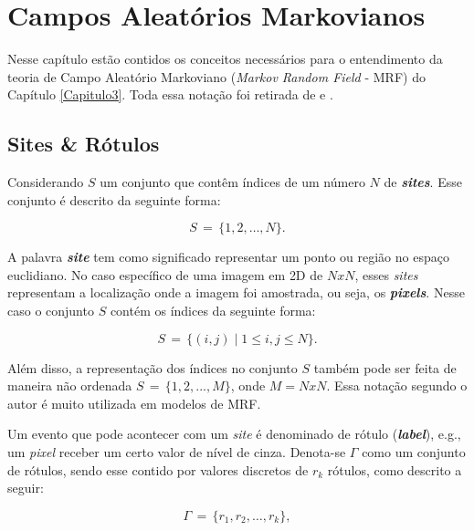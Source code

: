 \chapter{Campos Aleatórios Markovianos}\label{ApendiceA:CamposAleatóriosMarkovianos}

Nesse capítulo estão contidos os conceitos necessários para o entendimento da teoria de Campo Aleatório Markoviano (\textit{Markov Random Field} - \acs{MRF}) do Capítulo \ref{Capitulo3}. Toda essa notação foi retirada de  e .

\section{Sites \& Rótulos}\label{ApendiceA:SitesRotulos}

Considerando $S$ um conjunto que contêm índices de um número $N$ de \textit{\textbf{sites}}. Esse conjunto é descrito da seguinte forma:  

\begin{equation}
	S \, = \, \{1,2,\dots,N\}.
	\label{eq:eqApendiceAConjuntoSites}
\end{equation}  

A palavra \textit{\textbf{site}} tem como significado representar um ponto ou região no espaço euclidiano. No caso específico de uma imagem em \acs{2D} de $NxN$, esses \textit{sites} representam a localização onde a imagem foi amostrada, ou seja, os \textit{\textbf{pixels}}. Nesse caso o conjunto $S$ contém os índices da seguinte forma:

\begin{equation}
	S \, = \, \{(i,j) \mid 1 \leq i,j \leq N\}.
	\label{eq:eqApendiceAConjuntoSites2D}
\end{equation}  

Além disso, a representação dos índices no conjunto $S$ também pode ser feita de maneira não ordenada $S \, = \, \{1,2,...,M\}$, onde $M = NxN$. Essa notação segundo o autor é muito utilizada em modelos de \acs{MRF}. 

Um evento que pode acontecer com um \textit{site} é denominado de rótulo (\textit{\textbf{label}}), e.g., um \textit{pixel} receber um certo valor de nível de cinza. Denota-se $\varGamma$ como um conjunto de rótulos, sendo esse contido por valores discretos de $r_{k}$ rótulos, como descrito a seguir:

\begin{equation}
	\varGamma \, = \, \{r_{1},r_{2},\dots,r_{k}\},
	\label{eq:eqApendiceAConjuntoRotulos}
\end{equation} 

